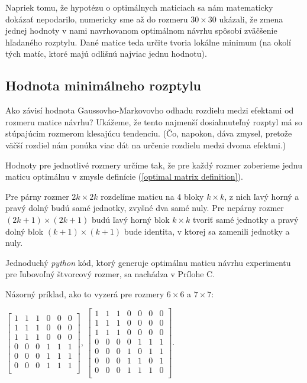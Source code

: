 Napriek tomu, že hypotézu o optimálnych maticiach sa nám matematicky dokázať nepodarilo, numericky sme až do rozmeru $30 \times 30$ ukázali,
že zmena jednej hodnoty v nami navrhovanom optimálnom návrhu spôsobí zväčšenie hľadaného rozptylu.
Dané matice teda určite tvoria lokálne minimum (na okolí tých matíc, ktoré majú odlišnú najviac jednu hodnotu).

\subsection{Hodnota minimálneho rozptylu}

Ako závisí hodnota Gaussovho-Markovovho odhadu rozdielu medzi efektami od rozmeru matice návrhu? 
Ukážeme, že tento najmenší dosiahnuteľný rozptyl má so stúpajúcim rozmerom klesajúcu tendenciu. 
(Čo, napokon, dáva zmysel, pretože väčší rozdiel nám ponúka viac dát na určenie rozdielu medzi dvoma efektmi.)

Hodnoty pre jednotlivé rozmery určíme tak, že pre každý rozmer zoberieme jednu maticu optimálnu 
v zmysle definície (\ref{optimal matrix definition}).

Pre párny rozmer $2k \times 2k$ rozdelíme maticu na $4$ bloky $k \times k$, 
z nich ľavý horný a pravý dolný budú samé jednotky, zvyšné dva samé nuly. 
Pre nepárny rozmer $(2k + 1) \times (2k + 1)$ budú ľavý horný blok $k \times k$ tvoriť samé jednotky 
a pravý dolný blok $(k + 1) \times (k + 1)$ bude identita, v ktorej sa zamenili jednotky a nuly.

Jednoduchý \emph{python} kód, ktorý generuje optimálnu maticu návrhu experimentu pre ľubovoľný štvorcový rozmer,
sa nachádza v Prílohe C.

Názorný príklad, ako to vyzerá pre rozmery $6 \times 6$ a $7 \times 7$:

\begin{center}
$
\begin{bmatrix}
1 & 1 & 1 & 0 & 0 & 0 \\
1 & 1 & 1 & 0 & 0 & 0 \\
1 & 1 & 1 & 0 & 0 & 0 \\
0 & 0 & 0 & 1 & 1 & 1 \\
0 & 0 & 0 & 1 & 1 & 1 \\
0 & 0 & 0 & 1 & 1 & 1 \\
\end{bmatrix}
$,
$
\begin{bmatrix}
1 & 1 & 1 & 0 & 0 & 0 & 0 \\
1 & 1 & 1 & 0 & 0 & 0 & 0 \\
1 & 1 & 1 & 0 & 0 & 0 & 0 \\
0 & 0 & 0 & 0 & 1 & 1 & 1 \\
0 & 0 & 0 & 1 & 0 & 1 & 1 \\
0 & 0 & 0 & 1 & 1 & 0 & 1 \\
0 & 0 & 0 & 1 & 1 & 1 & 0 \\
\end{bmatrix}
$.
\end{center}


